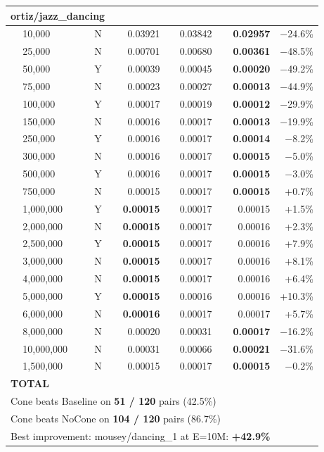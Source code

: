 \documentclass[9pt]{article}
\begin{document}
\begin{longtable}{llr|rrr|r}
\midrule
\multicolumn{7}{l}{\textbf{ortiz/jazz\_dancing}} \\
\midrule
 & 10,000 & N & 0.03921 & 0.03842 & \textbf{0.02957} & $-$24.6\% \\
 & 25,000 & N & 0.00701 & 0.00680 & \textbf{0.00361} & $-$48.5\% \\
 & 50,000 & Y & 0.00039 & 0.00045 & \textbf{0.00020} & $-$49.2\% \\
 & 75,000 & N & 0.00023 & 0.00027 & \textbf{0.00013} & $-$44.9\% \\
 & 100,000 & Y & 0.00017 & 0.00019 & \textbf{0.00012} & $-$29.9\% \\
 & 150,000 & N & 0.00016 & 0.00017 & \textbf{0.00013} & $-$19.9\% \\
 & 250,000 & Y & 0.00016 & 0.00017 & \textbf{0.00014} & $-$8.2\% \\
 & 300,000 & N & 0.00016 & 0.00017 & \textbf{0.00015} & $-$5.0\% \\
 & 500,000 & Y & 0.00016 & 0.00017 & \textbf{0.00015} & $-$3.0\% \\
 & 750,000 & N & 0.00015 & 0.00017 & \textbf{0.00015} & +0.7\% \\
\rowcolor{win} & 1,000,000 & Y & \textbf{0.00015} & 0.00017 & 0.00015 & +1.5\% \\
\rowcolor{win} & 2,000,000 & N & \textbf{0.00015} & 0.00017 & 0.00016 & +2.3\% \\
\rowcolor{win} & 2,500,000 & Y & \textbf{0.00015} & 0.00017 & 0.00016 & +7.9\% \\
\rowcolor{win} & 3,000,000 & N & \textbf{0.00015} & 0.00017 & 0.00016 & +8.1\% \\
\rowcolor{win} & 4,000,000 & N & \textbf{0.00015} & 0.00017 & 0.00016 & +6.4\% \\
\rowcolor{win} & 5,000,000 & Y & \textbf{0.00015} & 0.00016 & 0.00016 & +10.3\% \\
\rowcolor{win} & 6,000,000 & N & \textbf{0.00016} & 0.00017 & 0.00017 & +5.7\% \\
 & 8,000,000 & N & 0.00020 & 0.00031 & \textbf{0.00017} & $-$16.2\% \\
 & 10,000,000 & N & 0.00031 & 0.00066 & \textbf{0.00021} & $-$31.6\% \\
 & 1,500,000 & N & 0.00015 & 0.00017 & \textbf{0.00015} & $-$0.2\% \\

\midrule
\multicolumn{7}{l}{\textbf{TOTAL}} \\
\midrule
\multicolumn{6}{l}{Cone beats Baseline on \textbf{51 / 120} pairs (42.5\%)} & \\
\multicolumn{6}{l}{Cone beats NoCone on \textbf{104 / 120} pairs (86.7\%)} & \\
\multicolumn{6}{l}{Best improvement: mousey/dancing\_1 at E=10M: \textbf{+42.9\%}} & \\
\bottomrule
\end{longtable}
\end{document}
